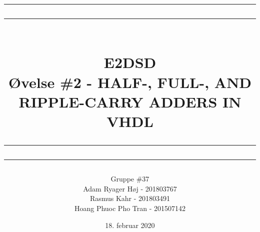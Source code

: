 \documentclass[12pt,a4paper]{article}
\newcommand\mymaketitle[1]{
   \rule{\textwidth}{1.6pt}\vspace*{-\baselineskip}\vspace*{2pt}
   \rule{\textwidth}{0.4pt}
   \\   
   \huge \bf #1\\
   \vspace{-8pt}
   \rule{\textwidth}{0.4pt}\vspace*{-\baselineskip}\vspace{3.2pt}
   \rule{\textwidth}{1.6pt}
}
\begin{document}
\title{
	\mymaketitle{E2DSD\\Øvelse \#2 - HALF-, FULL-, AND RIPPLE-CARRY ADDERS IN VHDL}
}
\author{
	Gruppe \#37\\
	Adam Ryager Høj - 201803767\\
   Rasmus Kahr - 201803491\\
   Hoang Phuoc Pho Tran - 201507142
}
\date{18. februar 2020}

\maketitle






\end{document}
